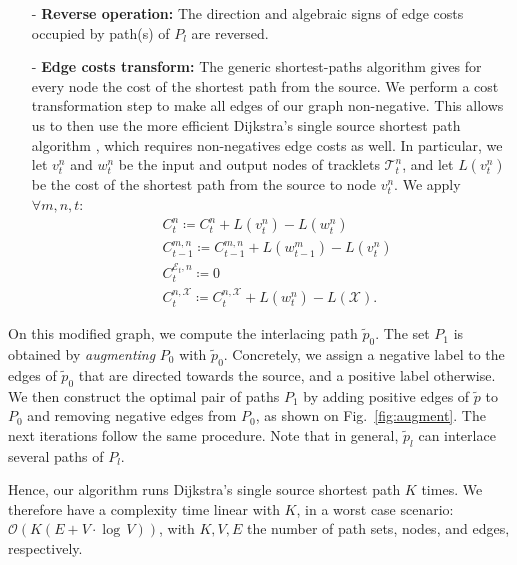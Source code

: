 \begin{itemize}
\item[-]  {\bf{Reverse operation:}} The direction and algebraic signs of edge costs occupied by path(s) of $P_{l}$ are reversed.
\item[-] {\bf{Edge costs transform:}}
The generic shortest-paths algorithm gives for every node the cost of the shortest path from the source. We perform a cost transformation step to make all edges of our graph non-negative. This allows us to then use the more efficient Dijkstra's single source shortest path algorithm \cite{dijkstra59}, which requires non-negatives edge costs as well.
In particular, we let $v_t^n$ and $w_t^n$ be the input and output nodes of tracklets $\mathcal{T}_t^n$, and let $L(v_t^n)$ be the cost of the shortest path from the source to node $v_t^n$. We apply $\forall m,n,t$:
\begin{subequations}
\label{eq:cost_transform}
\begin{align}
&C_t^{n} \coloneqq C_t^n + L(v_t^n) - L(w_t^n)\label{eq:cost_transform_tracklet}\\
&C_{t-1}^{m,n} \coloneqq C_{t-1}^{m,n} + L(w_{t-1}^m) - L(v_{t}^n)\label{eq:cost_transform_transition}\\
&C_t^{\mathcal{E}_t,n} \coloneqq 0 \label{eq:cost_transform_entrance}\\
&C_t^{n,\mathcal{X}} \coloneqq C_t^{n,\mathcal{X}} + L(w_t^n) - L(\mathcal{X}). \label{eq:cost_transform_sink}
\end{align}
\end{subequations}
\end{itemize}

On this modified graph, we compute the interlacing path $\tilde{p}_0$. The set $P_{1}$ is obtained by {\it augmenting} $P_0$ with $\tilde{p}_0$. Concretely, we assign a negative label to the edges of $\tilde{p}_0$ that are directed towards the source, and a positive label otherwise. We then construct the optimal pair of paths $P_{1}$ by adding positive edges of $\tilde{p}$ to $P_0$ and removing negative edges from $P_0$, as shown on Fig.~\ref{fig:augment}. The next iterations follow the same procedure. Note that in general, $\tilde{p}_l$ can interlace several paths of $P_l$.

Hence, our algorithm runs Dijkstra's single source shortest path $K$ times. We therefore have a complexity time linear with $K$, \ie in a worst case scenario: $\mathcal{O} \left( K(E + V \cdot \log \, V) \right)$, with $K, V, E$ the number of path sets, nodes, and edges, respectively.

